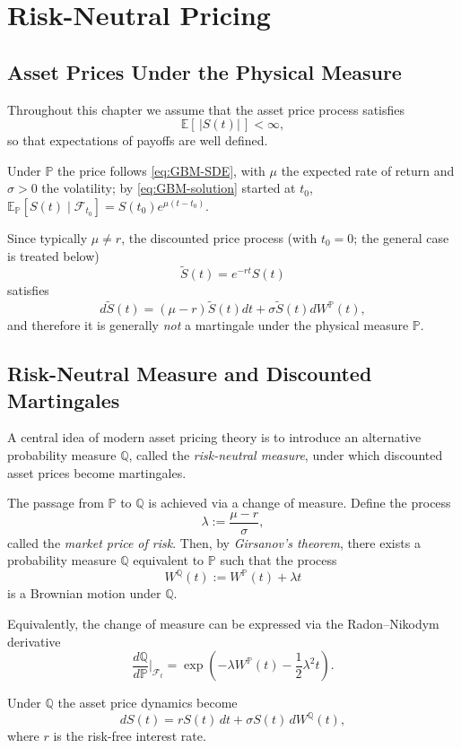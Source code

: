 \section{Risk-Neutral Pricing}
\subsection{Asset Prices Under the Physical Measure}

Throughout this chapter we assume that the asset price process satisfies
\[
\mathbb{E}[\,|S(t)|\,] < \infty,
\]
so that expectations of payoffs are well defined.

Under $\mathbb{P}$ the price follows \eqref{eq:GBM-SDE}, with $\mu$ the expected rate of return and $\sigma>0$ the volatility; by \eqref{eq:GBM-solution} started at $t_0$, $\mathbb{E}_{\mathbb{P}}[S(t)\mid\mathcal{F}_{t_0}]=S(t_0)e^{\mu(t-t_0)}$.

Since typically $\mu \neq r$, the discounted price process (with $t_0=0$; the general case is treated below)
\[
\tilde S(t)=e^{-rt}S(t)
\]
satisfies
\[
d\tilde S(t)
=
(\mu-r)\tilde S(t)dt
+
\sigma\tilde S(t)dW^{\mathbb P}(t),
\]
and therefore it is generally \emph{not} a martingale under the physical measure $\mathbb{P}$.
\subsection{Risk-Neutral Measure and Discounted Martingales}

A central idea of modern asset pricing theory is to introduce an alternative probability measure $\mathbb{Q}$, called the \emph{risk-neutral measure}, under which discounted asset prices become martingales.

\par
The passage from $\mathbb{P}$ to $\mathbb{Q}$ is achieved via a change of measure. Define the process
\[
\lambda := \frac{\mu - r}{\sigma},
\]
called the \textit{market price of risk}. Then, by \textit{Girsanov's theorem}, there exists a probability measure $\mathbb{Q}$ equivalent to $\mathbb{P}$ such that the process
\[
W^{\mathbb{Q}}(t) := W^{\mathbb{P}}(t) + \lambda t
\]
is a Brownian motion under $\mathbb{Q}$.

\par
Equivalently, the change of measure can be expressed via the Radon--Nikodym derivative
\[
\frac{d\mathbb{Q}}{d\mathbb{P}}\Big|_{\mathcal{F}_t}
=
\exp\left(
- \lambda W^{\mathbb{P}}(t)
- \frac{1}{2}\lambda^2 t
\right).
\]

\par
Under $\mathbb{Q}$ the asset price dynamics become
\[
dS(t) = r S(t)\,dt + \sigma S(t)\, dW^{\mathbb{Q}}(t),
\]
where $r$ is the risk-free interest rate.

